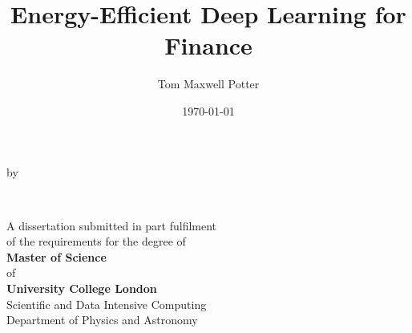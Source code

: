\documentclass[a4paper, 12pt]{report}
\title{Energy-Efficient Deep Learning for Finance}
\author{Tom Maxwell Potter}
\date{\today}
\begin{document}
    \begin{titlepage}
        \begin{center}
            \vspace*{1cm}
            
            \vfill
            
            \makeatletter
            {\Huge\textbf{\@title}}


            \vspace{0.8cm}
            by
            \vspace{0.8cm}

            {\Large\textbf{\@author}}

            \vspace{1.5cm}
            {\textbf{\\\@date}}

            \vfill

            {A dissertation submitted in part fulfilment\\
            of the requirements for the degree of\\}
            {
            \textbf{Master of Science}\\
            of\\
            \textbf{University College London\\}}
            \vspace{1cm}
            {Scientific and Data Intensive Computing\\
            Department of Physics and Astronomy}

            \vspace{2cm}
        \end{center}
    \end{titlepage}
\end{document}
